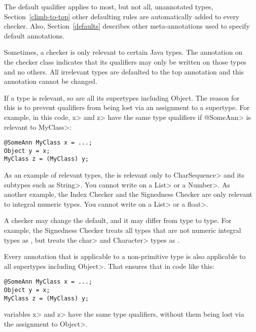 The default qualifier applies to most, but not all, unannotated types, Section~\ref{climb-to-top}
other defaulting rules are automatically added to every checker. Also, Section~\ref{defaults}
describes other meta-annotations used to specify default annotations.


Sometimes, a checker is only relevant to certain Java types.
The 
annotation on the checker class indicates that its qualifiers may only be
written on those types and no others.  All irrelevant types are defaulted to
the top annotation and this annotation cannot be changed.

If a type is relevant, so are all its supertypes including Object.
The reason for this is to prevent qualifiers from being lost via an
assignment to a supertype.  For example, in this code, \<x> and \<z> have
the same type qualifiers if \<@SomeAnn> is relevant to \<MyClass>:

\begin{Verbatim}
@SomeAnn MyClass x = ...;
Object y = x;
MyClass z = (MyClass) y;
\end{Verbatim}

As an example of relevant types, the  is relevant only to \<CharSequence> and its subtypes such
as \<String>.  You cannot write 
on a \<List> or a \<Number>.
%
As another example, the Index Checker and the Signedness Checker are only
relevant to integral numeric types.  You cannot write
 on a \<List> or a \<float>.

A checker may change the default, and it may differ from type to type.  For
example, the Signedness Checker treats all types that are not numeric
integral types as , but
treats the \<char> and \<Character> types as
.

Every annotation that is applicable to a non-primitive type is also
applicable to all supertypes including \<Object>.  That ensures that in
code like this:

\begin{Verbatim}
@SomeAnn MyClass x = ...;
Object y = x;
MyClass z = (MyClass) y;
\end{Verbatim}

\noindent
variables \<x> and \<z> have the same type qualifiers, without them being
lost via the assignment to \<Object>.


